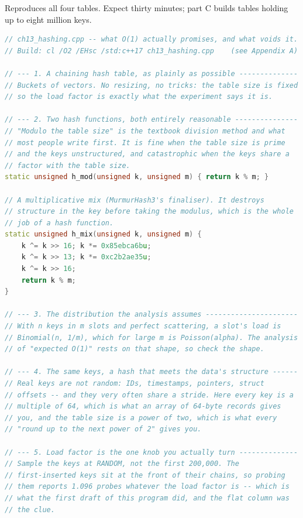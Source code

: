 \begin{lab}
Reproduces all four tables. Expect thirty minutes; part C builds tables holding
up to eight million keys.

\begin{lstlisting}[language=C++]
// ch13_hashing.cpp -- what O(1) actually promises, and what voids it.
// Build: cl /O2 /EHsc /std:c++17 ch13_hashing.cpp    (see Appendix A)

// --- 1. A chaining hash table, as plainly as possible --------------
// Buckets of vectors. No resizing, no tricks: the table size is fixed
// so the load factor is exactly what the experiment says it is.

// --- 2. Two hash functions, both entirely reasonable ---------------
// "Modulo the table size" is the textbook division method and what
// most people write first. It is fine when the table size is prime
// and the keys unstructured, and catastrophic when the keys share a
// factor with the table size.
static unsigned h_mod(unsigned k, unsigned m) { return k % m; }

// A multiplicative mix (MurmurHash3's finaliser). It destroys
// structure in the key before taking the modulus, which is the whole
// job of a hash function.
static unsigned h_mix(unsigned k, unsigned m) {
    k ^= k >> 16; k *= 0x85ebca6bu;
    k ^= k >> 13; k *= 0xc2b2ae35u;
    k ^= k >> 16;
    return k % m;
}

// --- 3. The distribution the analysis assumes ----------------------
// With n keys in m slots and perfect scattering, a slot's load is
// Binomial(n, 1/m), which for large m is Poisson(alpha). The analysis
// of "expected O(1)" rests on that shape, so check the shape.

// --- 4. The same keys, a hash that meets the data's structure ------
// Real keys are not random: IDs, timestamps, pointers, struct
// offsets -- and they very often share a stride. Here every key is a
// multiple of 64, which is what an array of 64-byte records gives
// you, and the table size is a power of two, which is what every
// "round up to the next power of 2" gives you.

// --- 5. Load factor is the one knob you actually turn --------------
// Sample the keys at RANDOM, not the first 200,000. The
// first-inserted keys sit at the front of their chains, so probing
// them reports 1.096 probes whatever the load factor is -- which is
// what the first draft of this program did, and the flat column was
// the clue.


\end{lstlisting}
\end{lab}
